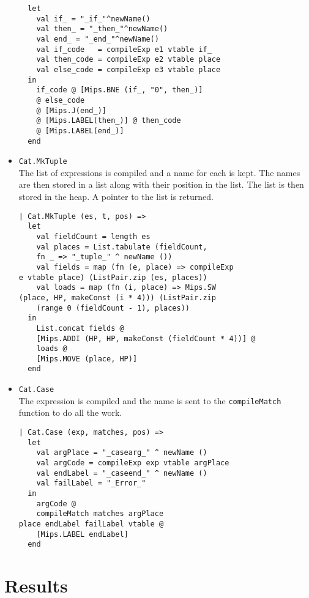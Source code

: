 \documentclass{article}
\begin{document}
\begin{itemize}
\begin{lstlisting}
  let
    val if_ = "_if_"^newName()
    val then_ = "_then_"^newName()
    val end_ = "_end_"^newName()
    val if_code   = compileExp e1 vtable if_
    val then_code = compileExp e2 vtable place
    val else_code = compileExp e3 vtable place
  in
    if_code @ [Mips.BNE (if_, "0", then_)] 
    @ else_code
    @ [Mips.J(end_)]
    @ [Mips.LABEL(then_)] @ then_code
    @ [Mips.LABEL(end_)]
  end
	\end{lstlisting}
	\item {\tt Cat.MkTuple } \\
	The list of expressions is compiled and a name for each is kept. The names are then stored in a list along with their position in the list. The list is then stored in the heap. A pointer to the list is returned.
	\begin{lstlisting}
| Cat.MkTuple (es, t, pos) =>
  let
    val fieldCount = length es
    val places = List.tabulate (fieldCount, 
	fn _ => "_tuple_" ^ newName ())
    val fields = map (fn (e, place) => compileExp 
e vtable place) (ListPair.zip (es, places))
    val loads = map (fn (i, place) => Mips.SW 
(place, HP, makeConst (i * 4))) (ListPair.zip 
	(range 0 (fieldCount - 1), places))
  in
    List.concat fields @
    [Mips.ADDI (HP, HP, makeConst (fieldCount * 4))] @
    loads @
    [Mips.MOVE (place, HP)]
  end
	\end{lstlisting}
	\item {\tt Cat.Case } \\
	The expression is compiled and the name is sent to the {\tt compileMatch} function to do all the work.
	\begin{lstlisting}
| Cat.Case (exp, matches, pos) =>
  let
    val argPlace = "_casearg_" ^ newName ()
    val argCode = compileExp exp vtable argPlace
    val endLabel = "_caseend_" ^ newName ()
    val failLabel = "_Error_"
  in
    argCode @
    compileMatch matches argPlace 
place endLabel failLabel vtable @
    [Mips.LABEL endLabel]
  end
	\end{lstlisting}
\end{itemize}

\section{Results}

%

\end{document}
